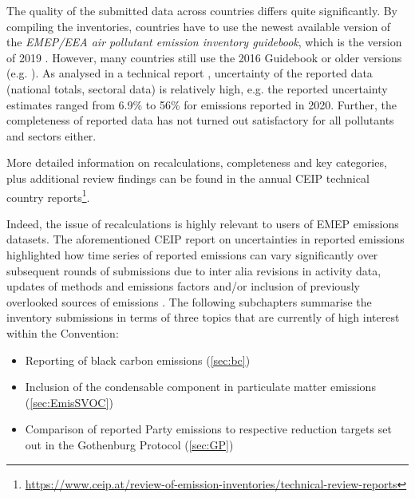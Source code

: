 The quality of the submitted data across countries differs quite significantly. By compiling the inventories, countries have to use the newest available version of the {\it EMEP/EEA air pollutant emission inventory guidebook}, which is the version of 2019 \citep{EmisInvGuide2019}. However, many countries still use the 2016 Guidebook \citep{EmisInvGuide2016} or older versions (e.g. \cite{EmisInvGuide2013}). As analysed in a technical report \citep{CEIP2021b}, uncertainty of the reported data (national totals, sectoral data) is relatively high, e.g. the reported uncertainty estimates ranged from 6.9\% to 56\% for \nox emissions reported in 2020. Further, the completeness of reported data has not turned out satisfactory for all pollutants and sectors either.

More detailed information on recalculations, completeness and key
categories, plus additional review findings can be found in the annual
CEIP technical country  reports{\footnote{\url{https://www.ceip.at/review-of-emission-inventories/technical-review-reports}}}.

Indeed, the issue of recalculations is highly relevant to users of EMEP emissions datasets. The aforementioned CEIP report on uncertainties in reported emissions highlighted how time series of reported emissions can vary significantly over subsequent rounds of submissions due to inter alia revisions in activity data, updates of methods and emissions factors and/or inclusion of previously overlooked sources of emissions \citep{CEIP2021b}.
The following subchapters summarise the inventory submissions in terms of three topics that are currently of high interest within the Convention:

\begin{itemize}
\item Reporting of black carbon emissions (\ref{sec:bc})
\item Inclusion of the condensable component in particulate matter emissions (\ref{sec:EmisSVOC}) 
\item Comparison of reported Party emissions to respective reduction targets set out in the Gothenburg Protocol  (\ref{sec:GP})
\end{itemize}
  
